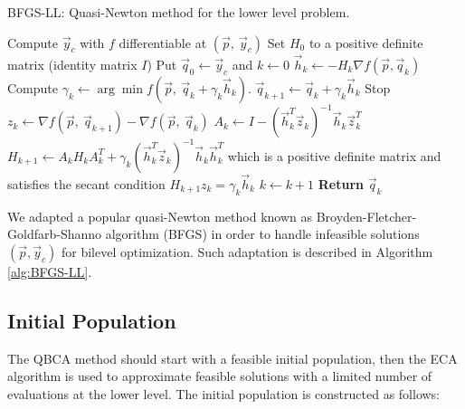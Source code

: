 \documentclass[conference]{IEEEtran}
\theoremstyle{definition}
\begin{document}
\begin{algorithm}[htbp]
    \caption{BFGS-LL: Quasi-Newton method for the lower level problem.}
    \label{alg:BFGS-LL}
    \begin{algorithmic}[1]
        \STATE Compute $\vec{y}_c$ with $f$ differentiable at $(\vec{p},\ \vec{y}_c)$
        \STATE Set $H_0$ to a positive definite matrix (identity matrix $I$)
        \STATE Put $\vec{q}_0 \gets \vec{y}_c$ and $k \gets 0$
            \STATE $\vec{h}_k \gets -H_k\nabla f(\vec{p}, \vec{q}_k)$
            \STATE Compute $\gamma_{k}\gets\arg \min f(\vec{p}, \ \vec{q} _{k}+ \gamma_k \vec{h} _{k})$.
            \STATE $\vec{q}_{k+1} \gets \vec{q}_k  + \gamma_k \vec{h}_k$
                \STATE Stop
            \ENDIF
            \STATE $z_k \gets \nabla f(\vec{p}, \ \vec{q}_{k+1}) - \nabla f(\vec{p}, \ \vec{q}_{k}) $
            \STATE $\displaystyle A_k \gets I - (\vec{h}_k^T \vec{z}_k)^{-1} \vec{h}_k \vec{z}_k^T$
            \STATE $H_{k+1} \gets A_k H_k A_k^T + \gamma_k(\vec{h}_k^T\vec{z}_k)^{-1}\vec{h}_k \vec{h}_k^T$
                   which is a positive definite matrix and satisfies the secant
                   condition $H_{k+1} z_k = \gamma_k \vec{h}_k$
            \STATE $k \gets k + 1$
        \ENDWHILE
        \STATE \textbf{Return} $\vec{q}_k$
    \end{algorithmic}
\end{algorithm}

We adapted a popular quasi-Newton method known as Broyden-Fletcher-Goldfarb-Shanno
algorithm (BFGS) \cite{fletcher2013practical} in order to handle infeasible
solutions $(\vec{p}, \vec{y}_c)$ for bilevel optimization. Such adaptation is
described in Algorithm \ref{alg:BFGS-LL}.
% 

\subsection{Initial Population} %
\label{sub:initial_population}


The QBCA method should start with a feasible initial population, then the ECA
algorithm \cite{Mejia2018} is used to approximate feasible solutions with a limited
number of evaluations at the lower level. The initial population is constructed
as follows:
\end{document}
